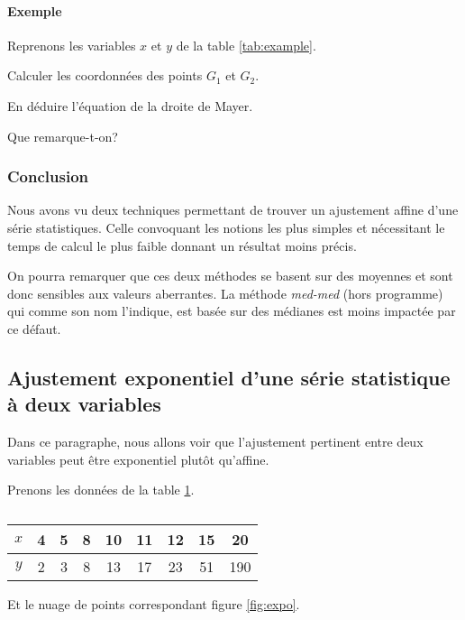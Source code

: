 \documentclass[a4paper,12pt]{scrartcl}
\begin{document}
\paragraph{Exemple}
Reprenons les variables $x$ et $y$ de la table \ref{tab:example}. 

Calculer les coordonnées des points $G_1$ et $G_2$.


En déduire l'équation de la droite de Mayer.


Que remarque-t-on?


\subsubsection*{Conclusion}
Nous avons vu deux techniques permettant de trouver un ajustement affine d'une série statistiques. Celle convoquant les notions les plus simples et nécessitant le temps de calcul le plus faible donnant un résultat moins précis. 

On pourra remarquer que ces deux méthodes se basent sur des moyennes et sont donc sensibles aux valeurs aberrantes. La méthode \emph{med-med} (hors programme) qui comme son nom l'indique, est basée sur des médianes est moins impactée par ce défaut.


\subsection[Ajustement exponentiel]{Ajustement exponentiel d'une série statistique à deux variables}

Dans ce paragraphe, nous allons voir que l'ajustement pertinent entre deux variables peut être exponentiel plutôt qu'affine.  

Prenons les données de la table \ref{tab:expo}.

\begin{table}[h]
    \centering
    \begin{tabular}{|c|c|c|c|c|c|c|c|c|}
        \hline
        $x$ & 4  & 5  & 8  & 10 & 11 & 12 & 15  & 20  \\ \hline
        $y$ & 2 & 3 & 8 & 13 & 17 & 23 & 51 & 190 \\ \hline
    \end{tabular}
    \caption{}
    \label{tab:expo}
\end{table}

Et le nuage de points correspondant figure \ref{fig:expo}.
\end{document}
